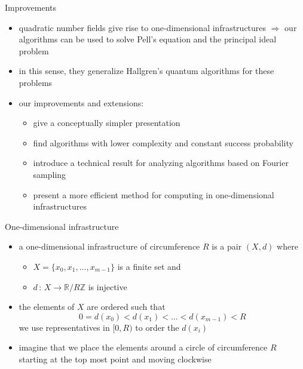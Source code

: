 \documentclass[slideColor]{prosper}
\renewcommand{\R}{\mathbb{R}}
\newcommand{\Z}{\mathbb{Z}}
\renewcommand{\>}{\rangle}
\newcommand{\<}{\langle}
\begin{document}
\begin{slide}{Improvements}
\vspace{-0.4cm}
\begin{itemize}
\item quadratic number fields give rise to one-dimensional infrastructures $\Rightarrow$ 
our algorithms can be used to solve Pell's equation and the principal ideal problem

\medskip
\item in this sense, they generalize Hallgren's quantum algorithms for these problems

\medskip
\item our improvements and extensions:

\begin{itemize}
\item give a conceptually simpler presentation 

\item find algorithms with lower complexity and constant success probability

\item introduce a technical result for analyzing algorithms based on Fourier sampling

\item present a more efficient method for computing in one-dimensional infrastructures
\end{itemize}
\end{itemize}
\end{slide}


\begin{slide}{One-dimensional infrastructure}

\begin{itemize}
\item a one-dimensional infrastructure of circumference $R$ is a pair $(X,d)$ where

\begin{itemize}
\item $X=\{x_0,x_1,\ldots,x_{m-1}\}$ is a finite set and

\medskip
\item $d \, : \, X \rightarrow \R/R\Z$ is injective
\end{itemize}

\medskip
\item the elements of $X$ are ordered such that 
\[
0=d(x_0)<d(x_1)<\ldots<d(x_{m-1})<R
\]
we use representatives in $[0,R)$ to order the $d(x_i)$

\medskip
\item imagine that we place the elements around a circle of circumference $R$ starting at the top most point and moving clockwise
\end{itemize}

\end{slide}
\end{document}

